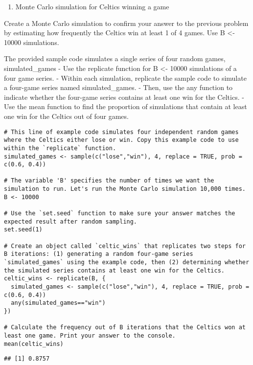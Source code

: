 \documentclass[
]{article}
\providecommand{\tightlist}{%
  \setlength{\itemsep}{0pt}\setlength{\parskip}{0pt}}
\begin{document}
\begin{enumerate}
\def\labelenumi{\arabic{enumi}.}
\setcounter{enumi}{4}
\tightlist
\item
  Monte Carlo simulation for Celtics winning a game
\end{enumerate}

Create a Monte Carlo simulation to confirm your answer to the previous
problem by estimating how frequently the Celtics win at least 1 of 4
games. Use B \textless- 10000 simulations.

The provided sample code simulates a single series of four random games,
simulated\_games - Use the replicate function for B \textless- 10000
simulations of a four game series. - Within each simulation, replicate
the sample code to simulate a four-game series named simulated\_games. -
Then, use the any function to indicate whether the four-game series
contains at least one win for the Celtics. - Use the mean function to
find the proportion of simulations that contain at least one win for the
Celtics out of four games.

\begin{verbatim}
# This line of example code simulates four independent random games where the Celtics either lose or win. Copy this example code to use within the `replicate` function.
simulated_games <- sample(c("lose","win"), 4, replace = TRUE, prob = c(0.6, 0.4))

# The variable 'B' specifies the number of times we want the simulation to run. Let's run the Monte Carlo simulation 10,000 times.
B <- 10000

# Use the `set.seed` function to make sure your answer matches the expected result after random sampling.
set.seed(1)

# Create an object called `celtic_wins` that replicates two steps for B iterations: (1) generating a random four-game series `simulated_games` using the example code, then (2) determining whether the simulated series contains at least one win for the Celtics.
celtic_wins <- replicate(B, {
  simulated_games <- sample(c("lose","win"), 4, replace = TRUE, prob = c(0.6, 0.4))
  any(simulated_games=="win")
})

# Calculate the frequency out of B iterations that the Celtics won at least one game. Print your answer to the console.
mean(celtic_wins)
\end{verbatim}

\begin{verbatim}
## [1] 0.8757
\end{verbatim}
\end{document}
